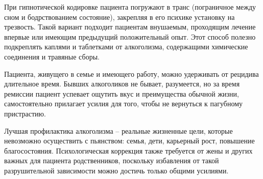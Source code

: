 При гипнотической кодировке пациента погружают в транс (пограничное между сном и бодрствованием состояние), закрепляя в его психике установку на трезвость. Такой вариант подходит пациентам внушаемым, проходящим лечение впервые или имеющим предыдущий положительный опыт. Этот способ полезно подкреплять каплями и таблетками от алкоголизма, содержащими химические соединения и травяные сборы.

Пациента, живущего в семье и имеющего работу, можно удерживать от рецидива длительное время. Бывших алкоголиков не бывает, разумеется, но за время ремиссии пациент успевает ощутить вкус и преимущества обычной жизни, самостоятельно прилагает усилия для того, чтобы не вернуться к пагубному пристрастию.

Лучшая профилактика алкоголизма – реальные жизненные цели, которые невозможно осуществить с пьянством: семья, дети, карьерный рост, повышение благосостояния. Психологическая коррекция также требуется от жены и других важных для пациента родственников, поскольку избавления от такой разрушительной зависимости можно достичь только общими усилиями.